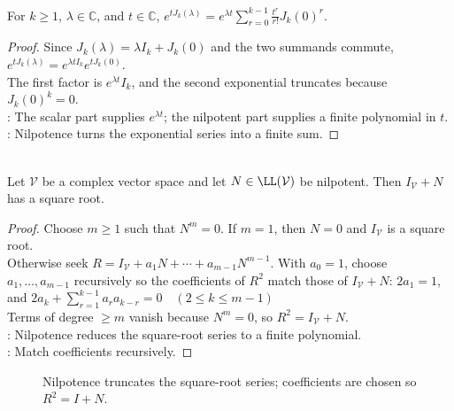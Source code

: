 \begin{proposition} \label{prop:exponential-of-jordan-block} \\
For $k\geq1$, $\lambda\in\mathbb{C}$, and $t\in\mathbb{C}$, $e^{tJ_k(\lambda)} =e^{\lambda t}\sum\limits_{r=0}^{k-1}\frac{t^r}{r!}J_k(0)^r$.
\begin{proof}
Since $J_k(\lambda)=\lambda I_k+J_k(0)$ and the two summands commute, $e^{tJ_k(\lambda)}=e^{\lambda tI_k}e^{tJ_k(0)}$.\\
The first factor is $e^{\lambda t}I_k$, and the second exponential truncates because $J_k(0)^k=0$.\\
: The scalar part supplies $e^{\lambda t}$; the nilpotent part supplies a finite polynomial in $t$.\\
: Nilpotence turns the exponential series into a finite sum.
\end{proof}
\end{proposition}

\begin{lemma} \label{lem:identity-plus-nilpotent-square-root} \\
Let $\mathcal{V}$ be a complex vector space and let $N\in\LL(\mathcal{V})$ be nilpotent. Then $I_{\mathcal{V}}+N$ has a square root.
\begin{proof}
Choose $m\geq1$ such that $N^m=0$. If $m=1$, then $N=0$ and $I_{\mathcal{V}}$ is a square root.\\
Otherwise seek $R=I_{\mathcal{V}}+a_1N+\cdots+a_{m-1}N^{m-1}$. With $a_0=1$, choose $a_1,\ldots,a_{m-1}$ recursively so the coefficients of $R^2$ match those of $I_{\mathcal{V}}+N$: $2a_1=1$, and $2a_k+\sum\limits_{r=1}^{k-1}a_ra_{k-r}=0\quad (2\leq k\leq m-1)$\\
Terms of degree $\geq m$ vanish because $N^m=0$, so $R^2=I_{\mathcal{V}}+N$.\\
: Nilpotence reduces the square-root series to a finite polynomial.\\
: Match coefficients recursively.
\end{proof}
\end{lemma}

\begin{figure}[H]
  \centering
  
  \caption{Nilpotence truncates the square-root series; coefficients are chosen so $R^2=I+N$.}
  \label{fig:nilpotent-square-root-polynomial}
\end{figure}

